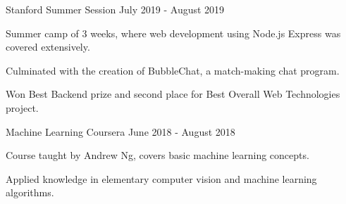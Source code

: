 
\begin{cventries}
  \cventry
    {}
    {Stanford Summer Session}
    {July 2019 - August 2019}
    {
      \begin{cvitems}
        \item {Summer camp of 3 weeks, where web development using Node.js Express was covered extensively.}
        \item {Culminated with the creation of BubbleChat, a match-making chat program.}
        \item {Won Best Backend prize and second place for Best Overall Web Technologies project.}
      \end{cvitems}
    }
  \cventry
    {Machine Learning}
    {Coursera}
    {June 2018 - August 2018}
    {
      \begin{cvitems}
        \item {Course taught by Andrew Ng, covers basic machine learning concepts.}
        \item {Applied knowledge in elementary computer vision and machine learning algorithms.}
      \end{cvitems}
    }
\end{cventries}
